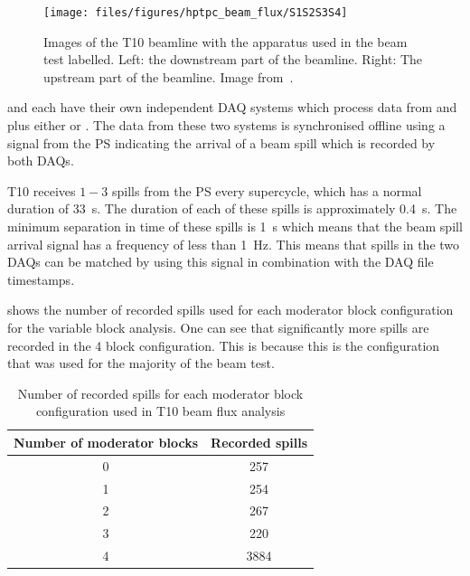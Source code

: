 \begin{figure}[h]
  \centering
  \texttt{[image: files/figures/hptpc\_beam\_flux/S1S2S3S4]}
  \caption[Images of the test beam setup with various objects labelled]{Images of the T10 beamline with the apparatus used in the beam test labelled. Left: the downstream part of the beamline. Right: The upstream part of the beamline. Image from~\cite{beampaper}.}
  \label{fig:beamlinePics}
\end{figure}

\SThree and \SFour each have their own independent DAQ systems which process data from \SOne and \STwo plus either \SThree or \SFour.
The data from these two systems is synchronised offline using a signal from the PS indicating the arrival of a beam spill which is recorded by both DAQs.

T10 receives $1-3$ spills from the PS every supercycle, which has a normal duration of \SI{33}{\second}.
The duration of each of these spills is approximately \SI{0.4}{\second}.
The minimum separation in time of these spills is \SI{1}{\second} which means that the beam spill arrival signal has a frequency of less than \SI{1}{\hertz}.
This means that spills in the two DAQs can be matched by using this signal in combination with the DAQ file timestamps.

 shows the number of recorded spills used for each moderator block configuration for the variable block analysis.
One can see that significantly more spills are recorded in the 4 block configuration.
This is because this is the configuration that was used for the majority of the beam test.

\begin{table}
  \centering
  \caption[Number of recorded spills for each moderator block configuration used in T10 beam flux analysis]{Number of recorded spills for each moderator block configuration used in T10 beam flux analysis}
  \label{tab:nSpills}
  \begin{tabular}{c c}
    \hline
    \hline
    Number of moderator blocks & Recorded spills \\
    \hline
    0 & 257 \\
    1 & 254 \\
    2 & 267 \\
    3 & 220 \\
    4 & 3884 \\
    \hline
  \end{tabular}
\end{table}


